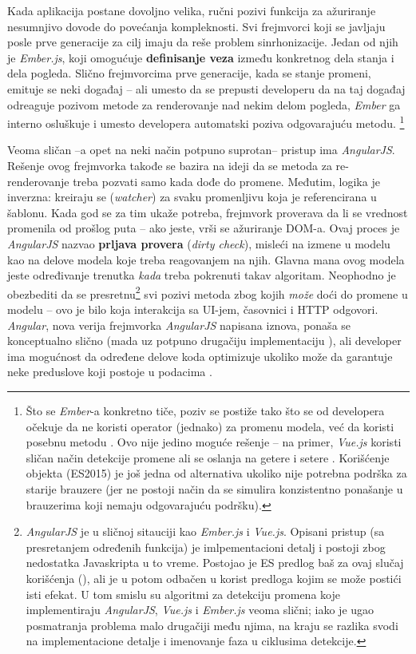 Kada aplikacija postane dovoljno velika, ručni pozivi funkcija za ažuriranje nesumnjivo dovode do povećanja kompleknosti.
Svi frejmvorci koji se javljaju posle prve generacije za cilj imaju da reše problem sinrhonizacije.
Jedan od njih je \textsl{Ember.js}, koji omogućuje \textbf{definisanje veza} između konkretnog dela stanja i dela pogleda.
Slično frejmvorcima prve generacije, kada se stanje promeni, emituje se neki događaj -- ali umesto da se prepusti developeru da na taj događaj odreaguje pozivom metode za renderovanje nad nekim delom pogleda, \textsl{Ember} ga interno osluškuje i umesto developera automatski poziva odgovarajuću metodu.%
\footnote{Što se \textsl{Ember}-a konkretno tiče,  poziv se postiže tako što se od developera očekuje da ne koristi operator \code{=} (jednako) za promenu modela, već da koristi posebnu metodu . Ovo nije jedino moguće rešenje -- na primer, \textsl{Vue.js} koristi sličan način detekcije promene ali se oslanja na getere i setere \cite{matt:vue-code}. Korišćenje  objekta (ES2015) je još jedna od alternativa ukoliko nije potrebna podrška za starije brauzere (jer ne postoji način da se simulira konzistentno ponašanje u brauzerima koji nemaju odgovarajuću podršku).}

Veoma sličan --a opet na neki način potpuno suprotan-- pristup ima \textsl{AngularJS}.
Rešenje ovog frejmvorka takođe se bazira na ideji da se metoda za re-renderovanje treba pozvati samo kada dođe do promene.
Međutim, logika je inverzna: kreiraju se  (\textsl{watcher}) za svaku promenljivu koja je referencirana u šablonu.
Kada god se za tim ukaže potreba, frejmvork proverava da li se vrednost promenila od prošlog puta -- ako jeste, vrši se ažuriranje DOM-a.
Ovaj proces je \textsl{AngularJS} nazvao \textbf{prljava provera} (\textsl{dirty check}), misleći na izmene u modelu kao na  delove modela koje treba  reagovanjem na njih.
Glavna mana ovog modela jeste određivanje trenutka \emph{kada} treba pokrenuti takav algoritam.
Neophodno je obezbediti da se presretnu\footnote{\textsl{AngularJS} je u sličnoj sitauciji kao \textsl{Ember.js} i \textsl{Vue.js}. Opisani pristup (sa presretanjem određenih funkcija) je imlpementacioni detalj i postoji zbog nedostatka Javaskripta u to vreme. Postojao je ES predlog baš za ovaj slučaj korišćenja (), ali je u potom odbačen u korist predloga  kojim se može postići isti efekat. U tom smislu su algoritmi za detekciju promena koje implementiraju \textsl{AngularJS}, \textsl{Vue.js} i \textsl{Ember.js} veoma slični; iako je ugao posmatranja problema malo drugačiji među njima, na kraju se razlika svodi na implementacione detalje i imenovanje faza u ciklusima detekcije.} svi pozivi metoda zbog kojih \textit{može} doći do promene u modelu -- ovo je bilo koja interakcija sa UI-jem, časovnici i HTTP odgovori.
\textsl{Angular}, nova verija frejmvorka \textsl{AngularJS} napisana iznova, ponaša se konceptualno slično (mada uz potpuno drugačiju implementaciju \cite{ng-uni:cd, milosz:ng-cd}), ali developer ima mogućnost da određene delove koda optimizuje ukoliko može da garantuje neke preduslove koji postoje u podacima \cite{savkin:cd, thoughtram:cd}.

